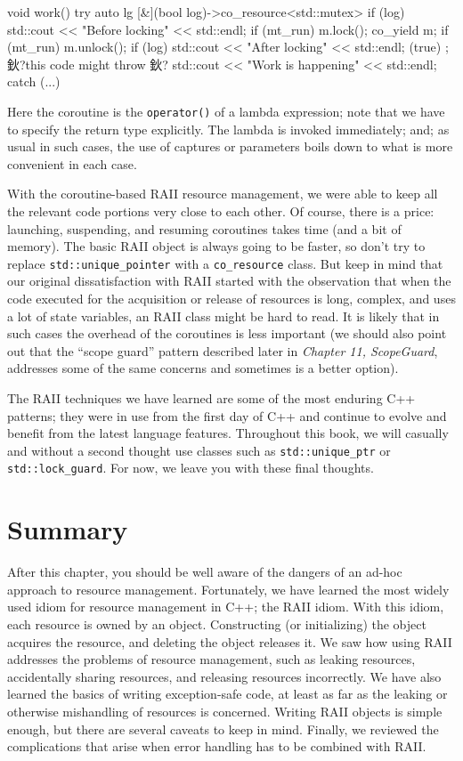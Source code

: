 \begin{code}
void work(){
  try {
    auto lg { [&](bool log)->co_resource<std::mutex> {
      if (log) std::cout << "Before locking" << std::endl;
      if (mt_run) m.lock();
      co_yield m;
      if (mt_run) m.unlock();
      if (log) std::cout << "After locking" << std::endl;
    }(true) };
    鈥?this code might throw 鈥?
    std::cout << "Work is happening" << std::endl;
  } catch (...) {}
}
\end{code}

Here the coroutine is the \texttt{operator()} of a lambda expression; note that we have to specify the return type explicitly. The lambda is invoked immediately; and; as usual in such cases, the use of captures or parameters boils down to what is more convenient in each case.

With the coroutine-based RAII resource management, we were able to keep all the relevant code portions very close to each other. Of course, there is a price: launching, suspending, and resuming coroutines takes time (and a bit of memory). The basic RAII object is always going to be faster, so don't try to replace \texttt{std::unique\_pointer} with a \texttt{co\_resource} class. But keep in mind that our original dissatisfaction with RAII started with the observation that when the code executed for the acquisition or release of resources is long, complex, and uses a lot of state variables, an RAII class might be hard to read. It is likely that in such cases the overhead of the coroutines is less important (we should also point out that the ``scope guard'' pattern described later in \emph{Chapter 11, ScopeGuard}, addresses some of the same concerns and sometimes is a better option).

The RAII techniques we have learned are some of the most enduring C++ patterns; they were in use from the first day of C++ and continue to evolve and benefit from the latest language features. Throughout this book, we will casually and without a second thought use classes such as \texttt{std::unique\_ptr} or \texttt{std::lock\_guard}. For now, we leave you with these final thoughts.

\section{Summary}

After this chapter, you should be well aware of the dangers of an ad-hoc approach to resource management. Fortunately, we have learned the most widely used idiom for resource management in C++; the RAII idiom. With this idiom, each resource is owned by an object. Constructing (or initializing) the object acquires the resource, and deleting the object releases it. We saw how using RAII addresses the problems of resource management, such as leaking resources, accidentally sharing resources, and releasing resources incorrectly. We have also learned the basics of writing exception-safe code, at least as far as the leaking or otherwise mishandling of resources is concerned. Writing RAII objects is simple enough, but there are several caveats to keep in mind. Finally, we reviewed the complications that arise when error handling has to be combined with RAII.

